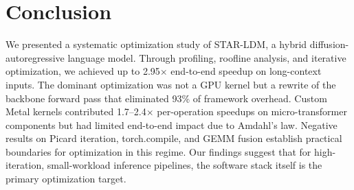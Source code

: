 \documentclass[sigconf,authordraft]{acmart}
\begin{document}
\section{Conclusion}

We presented a systematic optimization study of STAR-LDM, a hybrid diffusion-autoregressive language model. Through profiling, roofline analysis, and iterative optimization, we achieved up to 2.95$\times$ end-to-end speedup on long-context inputs. The dominant optimization was not a GPU kernel but a rewrite of the backbone forward pass that eliminated 93\% of framework overhead. Custom Metal kernels contributed 1.7--2.4$\times$ per-operation speedups on micro-transformer components but had limited end-to-end impact due to Amdahl's law. Negative results on Picard iteration, torch.compile, and GEMM fusion establish practical boundaries for optimization in this regime. Our findings suggest that for high-iteration, small-workload inference pipelines, the software stack itself is the primary optimization target.
\end{document}
